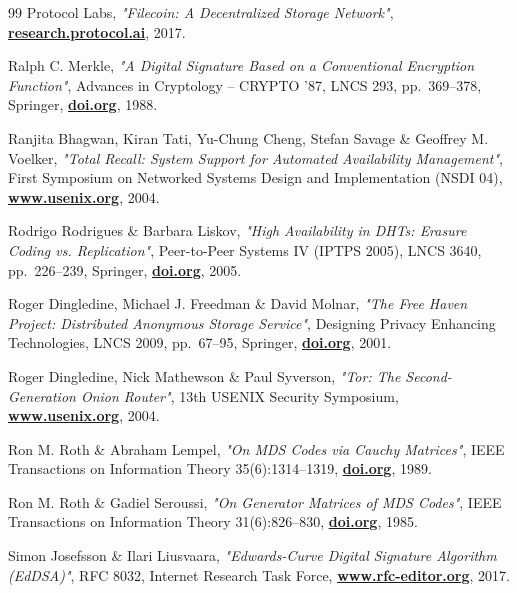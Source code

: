 \documentclass[10pt,a4paper,final]{article}
\let\oldhref\href
\renewcommand{\href}[2]{\oldhref{#1}{\bfseries#2}}
\begin{document}
\begin{thebibliography}{99}
	Protocol Labs,
	\emph{"Filecoin: A Decentralized Storage Network"},
	\href{https://research.protocol.ai/publications/filecoin-a-decentralized-storage-network/}{research.protocol.ai},
	2017.

	Ralph C. Merkle,
	\emph{"A Digital Signature Based on a Conventional Encryption Function"},
	Advances in Cryptology -- CRYPTO '87, LNCS 293, pp.~369--378, Springer,
	\href{https://doi.org/10.1007/3-540-48184-2_32}{doi.org},
	1988.

	Ranjita Bhagwan, Kiran Tati, Yu-Chung Cheng, Stefan Savage \& Geoffrey M. Voelker,
	\emph{"Total Recall: System Support for Automated Availability Management"},
	First Symposium on Networked Systems Design and Implementation (NSDI 04),
	\href{https://www.usenix.org/conference/nsdi-04/total-recall-system-support-automated-availability-management}{www.usenix.org},
	2004.

	Rodrigo Rodrigues \& Barbara Liskov,
	\emph{"High Availability in DHTs: Erasure Coding vs. Replication"},
	Peer-to-Peer Systems IV (IPTPS 2005), LNCS 3640, pp.~226--239, Springer,
	\href{https://doi.org/10.1007/11558989_21}{doi.org},
	2005.

	Roger Dingledine, Michael J. Freedman \& David Molnar,
	\emph{"The Free Haven Project: Distributed Anonymous Storage Service"},
	Designing Privacy Enhancing Technologies, LNCS 2009, pp.~67--95, Springer,
	\href{https://doi.org/10.1007/3-540-44702-4_5}{doi.org},
	2001.

	Roger Dingledine, Nick Mathewson \& Paul Syverson,
	\emph{"Tor: The Second-Generation Onion Router"},
	13th USENIX Security Symposium,
	\href{https://www.usenix.org/conference/13th-usenix-security-symposium/tor-second-generation-onion-router}{www.usenix.org},
	2004.

	Ron M. Roth \& Abraham Lempel,
	\emph{"On MDS Codes via Cauchy Matrices"},
	IEEE Transactions on Information Theory 35(6):1314--1319,
	\href{https://doi.org/10.1109/18.45291}{doi.org},
	1989.

	Ron M. Roth \& Gadiel Seroussi,
	\emph{"On Generator Matrices of MDS Codes"},
	IEEE Transactions on Information Theory 31(6):826--830,
	\href{https://doi.org/10.1109/TIT.1985.1057113}{doi.org},
	1985.

	Simon Josefsson \& Ilari Liusvaara,
	\emph{"Edwards-Curve Digital Signature Algorithm (EdDSA)"},
	RFC 8032, Internet Research Task Force,
	\href{https://www.rfc-editor.org/rfc/rfc8032}{www.rfc-editor.org},
	2017.


\end{thebibliography}
\end{document}

